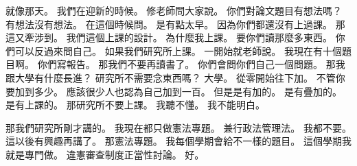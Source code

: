 \hypertarget{w01:cue:69}{}就像那天。
\hypertarget{w01:cue:70}{}我們在迎新的時候。
\hypertarget{w01:cue:71}{}修老師問大家說。
\hypertarget{w01:cue:72}{}你們對論文題目有想法嗎？
\hypertarget{w01:cue:73}{}有想法沒有想法。
\hypertarget{w01:cue:74}{}在這個時候問。
\hypertarget{w01:cue:75}{}是有點太早。
\hypertarget{w01:cue:76}{}因為你們都還沒有上過課。
\hypertarget{w01:cue:77}{}那這又牽涉到。
\hypertarget{w01:cue:78}{}我們這個上課的設計。
\hypertarget{w01:cue:79}{}為什麼我上課。
\hypertarget{w01:cue:80}{}要你們讀那麼多東西。
\hypertarget{w01:cue:81}{}你們可以反過來問自己。
\hypertarget{w01:cue:82}{}如果我們研究所上課。
\hypertarget{w01:cue:83}{}一開始就老師說。
\hypertarget{w01:cue:84}{}我現在有十個題目啊。
\hypertarget{w01:cue:85}{}你們寫報告。
\hypertarget{w01:cue:86}{}那我們不要再讀書了。
\hypertarget{w01:cue:87}{}你們會問你們自己一個問題。
\hypertarget{w01:cue:88}{}那我跟大學有什麼長進？
\hypertarget{w01:cue:89}{}研究所不需要念東西嗎？
\hypertarget{w01:cue:90}{}大學。
\hypertarget{w01:cue:91}{}從零開始往下加。
\hypertarget{w01:cue:92}{}不管你要加到多少。
\hypertarget{w01:cue:93}{}應該很少人也認為自己加到一百。
\hypertarget{w01:cue:94}{}但是是有加的。
\hypertarget{w01:cue:95}{}是有疊加的。
\hypertarget{w01:cue:96}{}是有上課的。
\hypertarget{w01:cue:97}{}那研究所不要上課。
\hypertarget{w01:cue:98}{}我聽不懂。
\hypertarget{w01:cue:99}{}我不能明白。

\hypertarget{w01:cue:100}{}那我們研究所剛才講的。
\hypertarget{w01:cue:101}{}我現在都只做憲法專題。
\hypertarget{w01:cue:102}{}兼行政法管理法。
\hypertarget{w01:cue:103}{}我都不要。
\hypertarget{w01:cue:104}{}這以後有興趣再講了。
\hypertarget{w01:cue:105}{}那憲法專題。
\hypertarget{w01:cue:106}{}我每個學期會給不一樣的題目。
\hypertarget{w01:cue:107}{}這個學期我就是專門做。
\hypertarget{w01:cue:108}{}違憲審查制度正當性討論。
\hypertarget{w01:cue:109}{}好。

